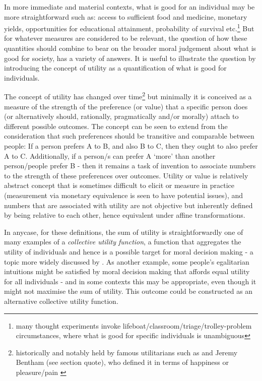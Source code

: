 In more immediate and material contexts, what is good for an individual may be more straightforward such as: access to sufficient food and medicine, monetary yields, opportunities for educational attainment, probability of survival etc.\footnote{many thought experiments invoke lifeboat/classroom/triage/trolley-problem circumstances, where what is good for specific individuals is unambiguous}
But for whatever measures are considered to be relevant, the question of how these quantities should combine to bear on the broader moral judgement about what is good for society, has a variety of answers.
It is useful to illustrate the question by introducing the concept of utility as a quantification of what is good for individuals.

The concept of utility has changed over time\footnote{historically and notably held by famous utilitarians such as \cite{MillGutenberg} and Jeremy Bentham (see section quote), who defined it in terms of happiness or pleasure/pain \citep{bentham1823introduction}}
but minimally it is conceived as a measure of the strength of the preference (or value) that a specific person does (or alternatively should, rationally, pragmatically and/or morally) attach to different possible outcomes.
The concept can be seen to extend from the consideration that such preferences should be transitive and comparable between people: If a person prefers A to B, and also B to C, then they ought to also prefer A to C. Additionally, if a person/s can prefer A `more' than another person/people prefer B - then it remains a task of invention to associate numbers to the strength of these preferences over outcomes.
Utility or value is relatively abstract concept that is sometimes difficult to elicit or measure in practice (measurement via monetary equivalence is seen to have potential issues), and numbers that are associated with utility are not objective but inherently defined by being relative to each other, hence equivalent under affine transformations.

In anycase, for these definitions, the sum of utility is straightforwardly one of many examples of a \textit{collective utility function}, a function that aggregates the utility of individuals and hence is a possible target for moral decision making - a topic more widely discussed by \cite{TheoriesofValueAggregation}.
As another example, some people's egalitarian intuitions might be satisfied by moral decision making that affords equal utility for all individuals - and in some contexts this may be appropriate, even though it might not maximise the sum of utility. This outcome could be constructed as an alternative collective utility function.

